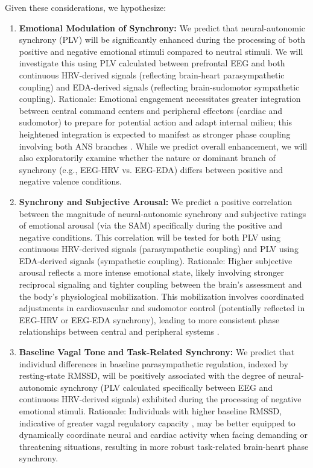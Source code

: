\documentclass[12pt]{article} %
\begin{document}
Given these considerations, we hypothesize:

\begin{enumerate}[label=(\alph*)] %
    \item \textbf{Emotional Modulation of Synchrony:} We predict that neural-autonomic synchrony (\gls{PLV}) will be significantly enhanced during the processing of both positive and negative emotional stimuli compared to neutral stimuli. We will investigate this using \gls{PLV} calculated between prefrontal \gls{EEG} and both continuous \gls{HRV}-derived signals (reflecting brain-heart parasympathetic coupling) and \gls{EDA}-derived signals (reflecting brain-sudomotor sympathetic coupling). Rationale: Emotional engagement necessitates greater integration between central command centers and peripheral effectors (cardiac and sudomotor) to prepare for potential action and adapt internal milieu; this heightened integration is expected to manifest as stronger phase coupling involving both \gls{ANS} branches \parencite{critchleyNeuralMechanismsAutonomic2005}. While we predict overall enhancement, we will also exploratorily examine whether the nature or dominant branch of synchrony (e.g., \gls{EEG}-\gls{HRV} vs. \gls{EEG}-\gls{EDA}) differs between positive and negative valence conditions.
    \item \textbf{Synchrony and Subjective Arousal:} We predict a positive correlation between the magnitude of neural-autonomic synchrony and subjective ratings of emotional arousal (via the \gls{SAM}) specifically during the positive and negative conditions. This correlation will be tested for both \gls{PLV} using continuous \gls{HRV}-derived signals (parasympathetic coupling) and \gls{PLV} using \gls{EDA}-derived signals (sympathetic coupling). Rationale: Higher subjective arousal reflects a more intense emotional state, likely involving stronger reciprocal signaling and tighter coupling between the brain's assessment and the body's physiological mobilization. This mobilization involves coordinated adjustments in cardiovascular and sudomotor control (potentially reflected in \gls{EEG}-\gls{HRV} or \gls{EEG}-\gls{EDA} synchrony), leading to more consistent phase relationships between central and peripheral systems \parencite{valenzaRevealingRealTimeEmotional2014, boucseinElectrodermalActivity2012}.
    \item \textbf{Baseline Vagal Tone and Task-Related Synchrony:} We predict that individual differences in baseline parasympathetic regulation, indexed by resting-state \gls{RMSSD}, will be positively associated with the degree of neural-autonomic synchrony (\gls{PLV} calculated specifically between \gls{EEG} and continuous \gls{HRV}-derived signals) exhibited during the processing of negative emotional stimuli. Rationale: Individuals with higher baseline \gls{RMSSD}, indicative of greater vagal regulatory capacity \parencite{thayerRelationshipAutonomicImbalance2010, shafferOverviewHeartRate2017}, may be better equipped to dynamically coordinate neural and cardiac activity when facing demanding or threatening situations, resulting in more robust task-related brain-heart phase synchrony.

\end{enumerate}
\end{document}
